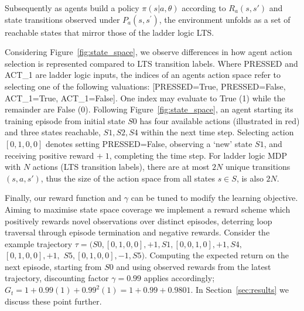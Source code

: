 \documentclass[runningheads]{llncs}
\begin{document}
Subsequently as agents build a policy $\pi(s|a,\theta)$ according to $R_a(s,s')$ and state transitions observed under $P_a(s,s^\prime)$, the environment unfolds as a set of reachable states that mirror those of the ladder logic LTS. 


Considering Figure~\ref{fig:state_space}, we observe differences in how agent action selection is represented compared to LTS transition labels. Where PRESSED and ACT\_1 are ladder logic inputs, the indices of an agents action space refer to selecting one of the following valuations: [PRESSED=True, PRESSED=False, ACT\_1=True, ACT\_1=False]. One index may evaluate to True (1) while the remainder are False (0). Following Figure~\ref{fig:state_space}, an agent starting its training episode from initial state $S0$ has four available actions (illustrated in red) and three states reachable, $S1,S2,S4$ within the next time step. Selecting action $[0,1,0,0]$ denotes setting PRESSED=False, observing a `new' state $S1$, and receiving positive reward $+\;1$, completing the time step. For ladder logic MDP with $N$ actions (LTS transition labels), there are at most $2N$ unique transitions $(s,a,s')$, thus the size of the action space from all states $s \in S$, is also $2N$. 

Finally, our reward function and $\gamma$ can be tuned to modify the learning objective. Aiming to maximise state space coverage we implement a reward scheme which positively rewards novel observations over distinct episodes, deterring loop traversal through episode termination and negative rewards. Consider the example trajectory $\tau =(S0, [0,1,0,0], + 1, S1, [0,0,1,0], + 1, S4,$ $[0,1,0,0], + 1,$ $S5, [0,1,0,0], -1, S5)$. Computing the expected return on the next episode, starting from $S0$ and using observed rewards from the latest trajectory, discounting factor $\gamma = 0.99$ applies accordingly; $G_t = 1 + 0.99(1) + 0.99^{2}(1) = 1 + 0.99 + 0.9801$.  In Section~\ref{sec:results} we discuss these point further.

\end{document}
